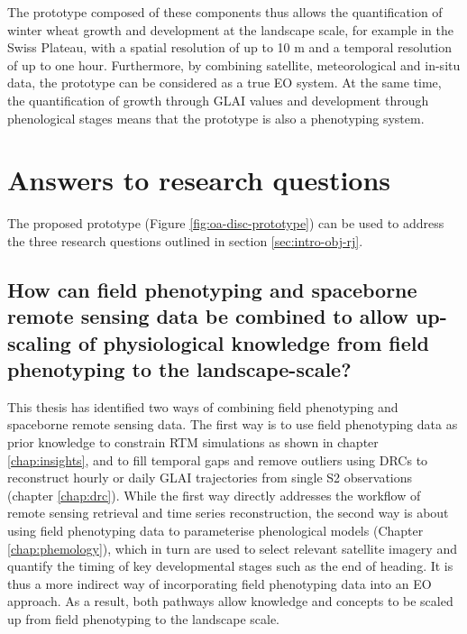 The prototype composed of these components thus allows the quantification of winter wheat growth and development at the landscape scale, for example in the Swiss Plateau, with a spatial resolution of up to 10 m and a temporal resolution of up to one hour. Furthermore, by combining satellite, meteorological and in-situ data, the prototype can be considered as a true \gls{EO} system. At the same time, the quantification of growth through \gls{GLAI} values and development through phenological stages means that the prototype is also a phenotyping system.


\section{Answers to research questions}
The proposed prototype (Figure \ref{fig:oa-disc-prototype}) can be used to address the three research questions outlined in section \ref{sec:intro-obj-rj}.

\subsection{How can field phenotyping and spaceborne remote sensing data be combined to allow up-scaling of physiological knowledge from field phenotyping to the landscape-scale?}
This thesis has identified two ways of combining field phenotyping and spaceborne remote sensing data. The first way is to use field phenotyping data as prior knowledge to constrain \gls{RTM} simulations as shown in chapter \ref{chap:insights}, and to fill temporal gaps and remove outliers using \gls{DRC}s to reconstruct hourly or daily \gls{GLAI} trajectories from single \gls{S2} observations (chapter \ref{chap:drc}). While the first way directly addresses the workflow of remote sensing retrieval and time series reconstruction, the second way is about using field phenotyping data to parameterise phenological models (Chapter \ref{chap:phemology}), which in turn are used to select relevant satellite imagery and quantify the timing of key developmental stages such as the end of heading. It is thus a more indirect way of incorporating field phenotyping data into an \gls{EO} approach. As a result, both pathways allow knowledge and concepts to be scaled up from field phenotyping to the landscape scale.


